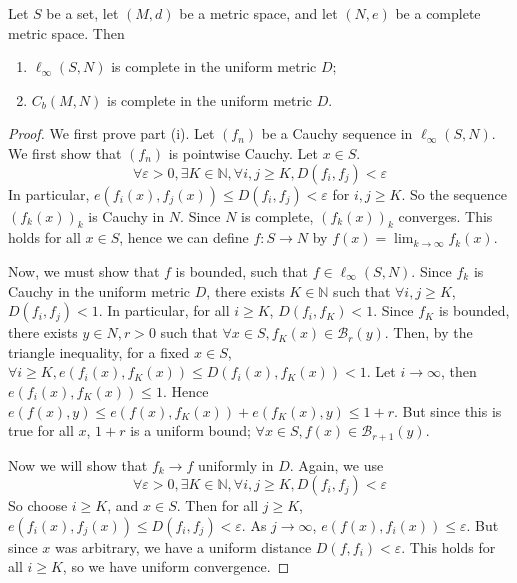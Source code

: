 \begin{theorem}
	Let \( S \) be a set, let \( (M,d) \) be a metric space, and let \( (N,e) \) be a complete metric space.
	Then
	\begin{enumerate}
		\item \( \ell_\infty(S,N) \) is complete in the uniform metric \( D \);
		\item \( C_b(M,N) \) is complete in the uniform metric \( D \).
	\end{enumerate}
\end{theorem}
\begin{proof}
	We first prove part (i).
	Let \( (f_n) \) be a Cauchy sequence in \( \ell_\infty(S, N) \).
	We first show that \( (f_n) \) is pointwise Cauchy.
	Let \( x \in S \).
	\[
		\forall \varepsilon > 0, \exists K \in \mathbb N, \forall i,j \geq K, D(f_i, f_j) < \varepsilon
	\]
	In particular, \( e(f_i(x), f_j(x)) \leq D(f_i,f_j) < \varepsilon \) for \( i,j \geq K \).
	So the sequence \( (f_k(x))_k \) is Cauchy in \( N \).
	Since \( N \) is complete, \( (f_k(x))_k \) converges.
	This holds for all \( x \in S \), hence we can define \( f \colon S \to N \) by \( f(x) = \lim_{k \to \infty} f_k(x) \).

	Now, we must show that \( f \) is bounded, such that \( f \in \ell_\infty(S,N) \).
	Since \( f_k \) is Cauchy in the uniform metric \( D \), there exists \( K \in \mathbb N \) such that \( \forall i,j \geq K \), \( D(f_i,f_j) < 1 \).
	In particular, for all \( i \geq K \), \( D(f_i,f_K) < 1 \).
	Since \( f_K \) is bounded, there exists \( y \in N, r > 0 \) such that \( \forall x \in S, f_K(x) \in \mathcal B_r(y) \).
	Then, by the triangle inequality, for a fixed \( x \in S \), \( \forall i \geq K, e(f_i(x), f_K(x)) \leq D(f_i(x), f_K(x)) < 1 \).
	Let \( i \to \infty \), then \( e(f_i(x), f_K(x)) \leq 1 \).
	Hence \( e(f(x),y) \leq e(f(x), f_K(x)) + e(f_K(x),y) \leq 1 + r \).
	But since this is true for all \( x \), \( 1 + r \) is a uniform bound; \( \forall x \in S, f(x) \in \mathcal B_{r+1}(y) \).

	Now we will show that \( f_k \to f \) uniformly in \( D \).
	Again, we use
	\[
		\forall \varepsilon > 0, \exists K \in \mathbb N, \forall i,j \geq K, D(f_i, f_j) < \varepsilon
	\]
	So choose \( i \geq K \), and \( x \in S \).
	Then for all \( j \geq K \), \( e(f_i(x), f_j(x)) \leq D(f_i, f_j) < \varepsilon \).
	As \( j \to \infty \), \( e(f(x), f_i(x)) \leq \varepsilon \).
	But since \( x \) was arbitrary, we have a uniform distance \( D(f, f_i) < \varepsilon \).
	This holds for all \( i \geq K \), so we have uniform convergence.


\end{proof}

